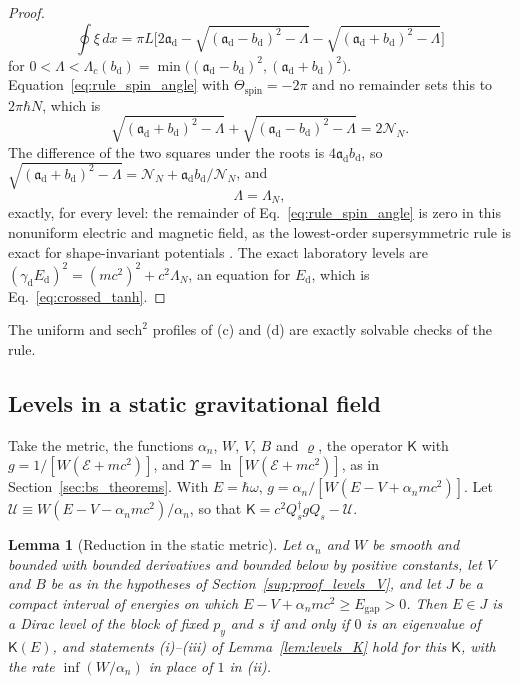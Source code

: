 \documentclass[aps,prd,onecolumn,tightenlines,nofootinbib,notitlepage,11pt,floatfix]{revtex4-2}
\theoremstyle{indentedtheorem}
\newtheorem{lemma}{Lemma}
\begin{document}
\begin{proof}
\begin{equation*}
    \oint\xi\,dx = \pi L\Big[2\mathfrak{a}_\text{d}-\sqrt{(\mathfrak{a}_\text{d}-b_\text{d})^2-\Lambda}-\sqrt{(\mathfrak{a}_\text{d}+b_\text{d})^2-\Lambda}\Big]
\end{equation*}
for $0<\Lambda<\Lambda_c(b_\text{d})=\min\big((\mathfrak{a}_\text{d}-b_\text{d})^2,(\mathfrak{a}_\text{d}+b_\text{d})^2\big)$. Equation~\eqref{eq:rule_spin_angle} with $\Theta_\text{spin}=-2\pi$ and no remainder sets this to $2\pi\hbar N$, which is
\begin{equation*}
    \sqrt{(\mathfrak{a}_\text{d}+b_\text{d})^2-\Lambda}+\sqrt{(\mathfrak{a}_\text{d}-b_\text{d})^2-\Lambda} = 2\mathcal{N}_N .
\end{equation*}
The difference of the two squares under the roots is $4\mathfrak{a}_\text{d}b_\text{d}$, so $\sqrt{(\mathfrak{a}_\text{d}+b_\text{d})^2-\Lambda}=\mathcal{N}_N+\mathfrak{a}_\text{d}b_\text{d}/\mathcal{N}_N$, and
\begin{equation*}
    \Lambda = \Lambda_N ,
\end{equation*}
exactly, for every level: the remainder of Eq.~\eqref{eq:rule_spin_angle} is zero in this nonuniform electric and magnetic field, as the lowest-order supersymmetric rule is exact for shape-invariant potentials \citep{CooperKhareSukhatme1995Supersymmetry}. The exact laboratory levels are $(\gamma_\text{d}E_\text{d})^2=(mc^2)^2+c^2\Lambda_N$, an equation for $E_\text{d}$, which is Eq.~\eqref{eq:crossed_tanh}.
\end{proof}

\noindent The uniform and $\mathrm{sech}^2$ profiles of (c) and (d) are exactly solvable checks of the rule.

\subsection{Levels in a static gravitational field}
\label{sup:proof_levels_grav}

Take the metric, the functions $\alpha_n$, $W$, $V$, $B$ and $\varrho$, the operator $\mathsf{K}$ with $g=1/[W(\mathcal{E}+mc^2)]$, and $\Upsilon=\ln[W(\mathcal{E}+mc^2)]$, as in Section~\ref{sec:bs_theorems}. With $E=\hbar\omega$, $g=\alpha_n/[W(E-V+\alpha_nmc^2)]$. Let $\mathcal{U}\equiv W(E-V-\alpha_nmc^2)/\alpha_n$, so that $\mathsf{K}=c^2Q_s^\dagger gQ_s-\mathcal{U}$.

\begin{lemma}[Reduction in the static metric]\label{lem:grav_K}
Let $\alpha_n$ and $W$ be smooth and bounded with bounded derivatives and bounded below by positive constants, let $V$ and $B$ be as in the hypotheses of Section~\ref{sup:proof_levels_V}, and let $J$ be a compact interval of energies on which $E-V+\alpha_nmc^2\geq E_\text{gap}>0$. Then $E\in J$ is a Dirac level of the block of fixed $p_y$ and $s$ if and only if $0$ is an eigenvalue of $\mathsf{K}(E)$, and statements (i)--(iii) of Lemma~\ref{lem:levels_K} hold for this $\mathsf{K}$, with the rate $\inf(W/\alpha_n)$ in place of $1$ in (ii).
\end{lemma}
\end{document}
